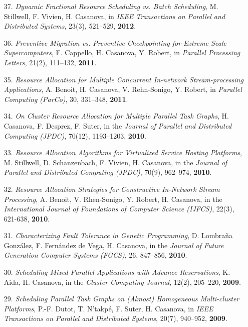 \begin{enumerate}
\item[37.] {\it Dynamic Fractional Resource Scheduling vs. Batch Scheduling}, M. Stillwell, F. Vivien, H. Casanova, in \emph{IEEE Transactions on Parallel and Distributed Systems}, 23(3), 521--529, {\bf 2012}.

\item[36.] {\it Preventive Migration vs. Preventive Checkpointing for Extreme Scale Supercomputers}, F. Cappello, H. Casanova, Y. Robert, in \emph{Parallel Processing Letters}, 21(2), 111--132, {\bf 2011}.

\item[35.] {\it Resource Allocation for Multiple Concurrent In-network Stream-processing Applications}, A. Benoit, H. Casanova, V. Rehn-Sonigo, Y. Robert, in \emph{Parallel Computing (ParCo)}, 30, 331--348, {\bf 2011}.

\item[34.] {\it On Cluster Resource Allocation for Multiple Parallel Task Graphs}, H. Casanova, F. Desprez, F. Suter, in the \emph{Journal of Parallel and Distributed Computing (JPDC)}, 70(12), 1193--1203, {\bf 2010}.

\item[33.] {\it Resource Allocation Algorithms for Virtualized Service Hosting Platforms}, M. Stillwell, D. Schanzenbach, F. Vivien, H. Casanova, in the \emph{Journal of Parallel and Distributed Computing (JPDC)}, 70(9), 962--974, {\bf 2010}.

\item[32.] {\it Resource Allocation Strategies for Constructive In-Network Stream Processing}, A. Benoit, V. Rhen-Sonigo, Y. Robert, H. Casanova, in the \emph{International Journal of Foundations of Computer Science (IJFCS)}, 22(3), 621-638, {\bf 2010}.

\item[31.] {\it Characterizing Fault Tolerance in Genetic Programming}, D. Lombraña González, F. Fernández de Vega, H. Casanova, in the \emph{Journal of Future Generation Computer Systems (FGCS)}, 26, 847--856, {\bf 2010}.

\item[30.] {\it Scheduling Mixed-Parallel Applications with Advance
Reservations}, K. Aida, H. Casanova, in the \emph{Cluster Computing
Journal}, 12(2), 205--220, {\bf 2009}.

\item[29.] {\it Scheduling Parallel Task Graphs on (Almost) Homogeneous
Multi-cluster Platforms}, P.-F. Dutot, T. N'takp\'e, F. Suter, H. Casanova,
in \emph{IEEE Transactions on Parallel and Distributed Systems}, 20(7), 940--952, {\bf 2009}.


\end{enumerate}
